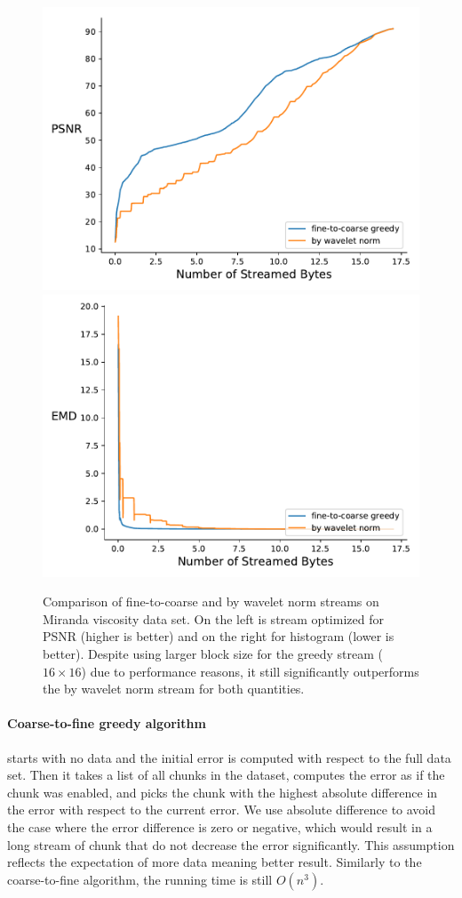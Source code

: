 \begin{figure}
        \centering
        \includegraphics[width=0.48\linewidth]{img/figure4_new/rmse-miranda-viscosity}
        \includegraphics[width=0.48\linewidth]{img/figure4_new/histogram-miranda-viscosity}
        \caption{Comparison of fine-to-coarse and by wavelet norm streams on Miranda viscosity data set.
                 On the left is stream optimized for PSNR (higher is better) and on the right for histogram (lower is better).
                 Despite using larger block size for the greedy stream ($16 \times 16$) due to performance reasons, it still
                 significantly outperforms the by wavelet norm stream for both quantities.}
\end{figure}


\paragraph*{Coarse-to-fine greedy algorithm} starts with no data and the initial error is computed with respect
to the full data set. Then it takes a list of all chunks in the dataset, computes the error as if the chunk was
enabled, and picks the chunk with the highest absolute difference in the error with respect to the current error.
We use absolute difference to avoid the case where the error difference is zero or negative, which would result
in a long stream of chunk that do not decrease the error significantly. This assumption reflects the expectation
of more data meaning better result. Similarly to the coarse-to-fine algorithm, the running time is still $O(n^3)$.


